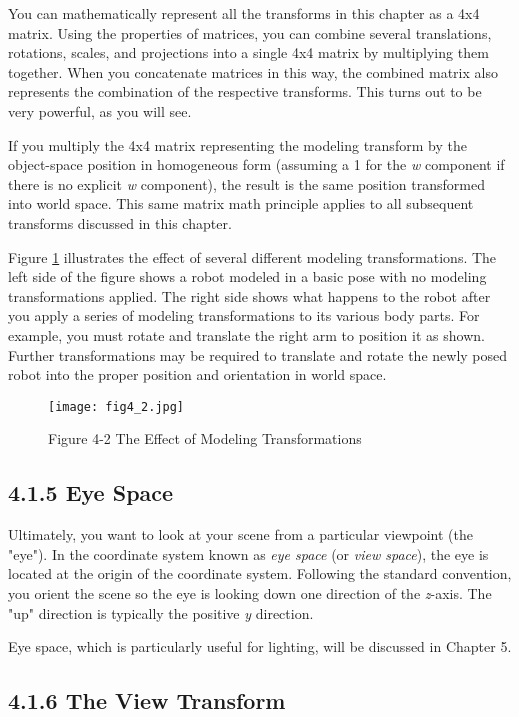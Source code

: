 \documentclass[../main.tex]{subfiles}
\begin{document}
You can mathematically represent all the transforms in this chapter as a 4x4 matrix. Using the properties of matrices, you can combine several translations, rotations, scales, and projections into a single 4x4 matrix by multiplying them together. When you concatenate matrices in this way, the combined matrix also represents the combination of the respective transforms. This turns out to be very powerful, as you will see.

If you multiply the 4x4 matrix representing the modeling transform by the object-space position in homogeneous form (assuming a 1 for the \textit{w} component if there is no explicit \textit{w} component), the result is the same position transformed into world space. This same matrix math principle applies to all subsequent transforms discussed in this chapter.

Figure \ref{fig:4-2} illustrates the effect of several different modeling transformations. The left side of the figure shows a robot modeled in a basic pose with no modeling transformations applied. The right side shows what happens to the robot after you apply a series of modeling transformations to its various body parts. For example, you must rotate and translate the right arm to position it as shown. Further transformations may be required to translate and rotate the newly posed robot into the proper position and orientation in world space.
\begin{figure}
    \centering
    \texttt{[image: fig4\_2.jpg]}
    \caption{Figure 4-2 The Effect of Modeling Transformations}
    \label{fig:4-2}
\end{figure}

\subsection{4.1.5 Eye Space}

Ultimately, you want to look at your scene from a particular viewpoint (the "eye"). In the coordinate system known as \textit{eye space} (or \textit{view space}), the eye is located at the origin of the coordinate system. Following the standard convention, you orient the scene so the eye is looking down one direction of the \textit{z}-axis. The "up" direction is typically the positive \textit{y} direction.

Eye space, which is particularly useful for lighting, will be discussed in Chapter 5.

\subsection{4.1.6 The View Transform}
\end{document}
